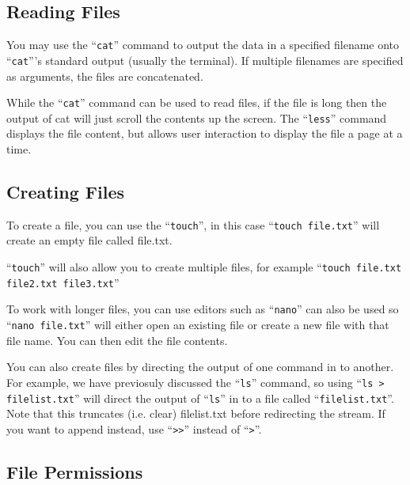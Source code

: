 \documentclass{extbook}
\begin{document}
\subsection{Reading Files}

You may use the ``\verb|cat|'' command to output the data in a specified filename onto ``\verb|cat|'''s standard output (usually the terminal).  If multiple filenames are specified as arguments, the files are concatenated.

While the ``\verb|cat|'' command can be used to read files, if the file is long then the output of cat will just scroll the contents up the screen.  The ``\verb|less|'' command displays the file content, but allows user interaction to display the file a page at a time.

\subsection{Creating Files}

To create a file, you can use the ``\verb|touch|'', in this case ``\verb|touch file.txt|'' will create an empty file called file.txt.

``\verb|touch|'' will also allow you to create multiple files, for example ``\verb|touch file.txt file2.txt file3.txt|''

To work with longer files, you can use editors such as ``\verb|nano|'' can also be used so ``\verb|nano file.txt|'' will either open an existing file or create a new file with that file name.   You can then edit the file contents.

You can also create files by directing the output of one command in to another.  For example, we have previosuly discussed the ``\verb|ls|'' command, so using ``\verb|ls > filelist.txt|'' will direct the output of ``\verb|ls|'' in to a file called ``\verb|filelist.txt|''.  Note that this truncates (i.e. clear) filelist.txt before redirecting the stream.  If you want to append instead, use ``\verb|>>|'' instead of ``\verb|>|''.


\subsection{File Permissions}
\end{document}
